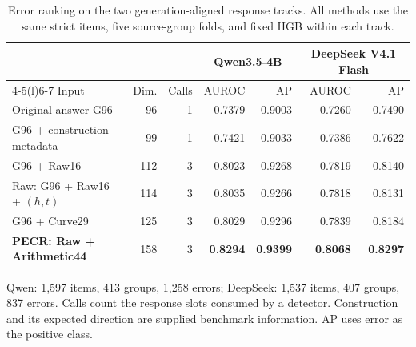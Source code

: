 \begin{table}[t]
\centering\small
\caption{Error ranking on the two generation-aligned response tracks. All methods use the same strict items, five source-group folds, and fixed HGB within each track.}
\label{tab:main}
\setlength{\tabcolsep}{4pt}
\begin{tabular}{@{}lrrrrrr@{}}
\toprule
& & & \multicolumn{2}{c}{Qwen3.5-4B} & \multicolumn{2}{c}{DeepSeek V4.1 Flash}\\\cmidrule(lr){4-5}\cmidrule(l){6-7} Input & Dim. & Calls & AUROC & AP & AUROC & AP\\
\midrule
Original-answer G96 & 96 & 1 & 0.7379 & 0.9003 & 0.7260 & 0.7490\\
G96 + construction metadata & 99 & 1 & 0.7421 & 0.9033 & 0.7386 & 0.7622\\
G96 + Raw16 & 112 & 3 & 0.8023 & 0.9268 & 0.7819 & 0.8140\\
Raw: G96 + Raw16 + $(h,t)$ & 114 & 3 & 0.8035 & 0.9266 & 0.7818 & 0.8131\\
G96 + Curve29 & 125 & 3 & 0.8029 & 0.9296 & 0.7839 & 0.8184\\
\textbf{PECR: Raw + Arithmetic44} & 158 & 3 & \textbf{0.8294} & \textbf{0.9399} & \textbf{0.8068} & \textbf{0.8297}\\
\bottomrule
\end{tabular}
\par\vspace{3pt}\begin{minipage}{\textwidth}\footnotesize Qwen: 1,597 items, 413 groups, 1,258 errors; DeepSeek: 1,537 items, 407 groups, 837 errors. Calls count the response slots consumed by a detector. Construction and its expected direction are supplied benchmark information. AP uses error as the positive class.\end{minipage}
\end{table}

